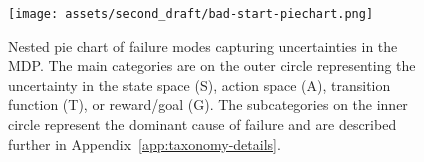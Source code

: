 \begin{figure}[t!]
    \centering
    \texttt{[image: assets/second\_draft/bad-start-piechart.png]}
    \caption{Nested pie chart of \gptfo{} \react{} failure modes capturing uncertainties in the MDP. The main categories are on the outer circle representing the uncertainty in the state space (S), action space (A), transition function (T), or reward/goal (G). The subcategories on the inner circle represent the dominant cause of failure and are described further in Appendix~\ref{app:taxonomy-details}.}
    \label{fig:piechart_taxonomy}
\end{figure}